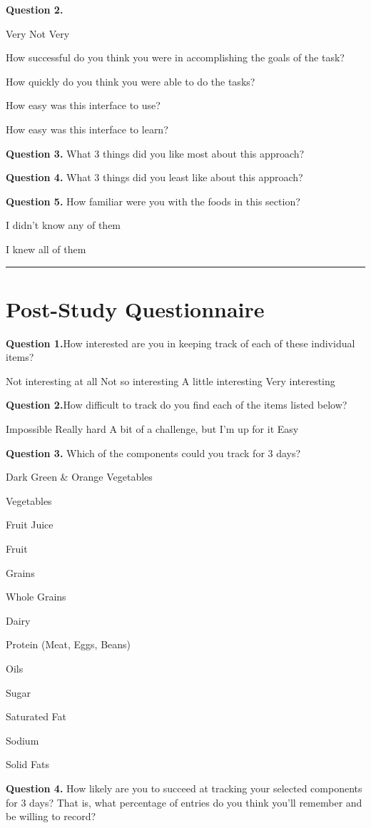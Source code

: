 \noindent\textbf{Question 2.}


 	Very						Not Very
\begin{itemize*}
\item How successful do you think you were in accomplishing the goals of the task?
\item How quickly do you think you were able to do the tasks?
\item How easy was this interface to use?
\item How easy was this interface to learn?
\end{itemize*}
\noindent\textbf{Question 3.}
What 3 things did you like most about this approach? 
 

\noindent\textbf{Question 4.}
What 3 things did you least like about this approach? 
 

\noindent\textbf{Question 5.}
How familiar were you with the foods in this section? 

\begin{itemize*}
\item	I didn't know any of them
\item	
\item	
\item	I knew all of them
\end{itemize*}

\hrule
\section{Post-Study Questionnaire}
\noindent\textbf{Question 1.}How interested are you in keeping track of each of these individual items? 

	Not interesting at all	Not so interesting	A little interesting	Very interesting

\noindent\textbf{Question 2.}How difficult to track do you find each of the items listed below? 

Impossible	Really hard	A bit of a challenge, but I'm up for it	Easy

\noindent\textbf{Question 3.}
Which of the components could you track for 3 days? 

\begin{itemize*}
\item	Dark Green \& Orange Vegetables
\item	Vegetables
\item	Fruit Juice
\item	Fruit
\item	Grains
\item	Whole Grains
\item	Dairy
\item	Protein (Meat, Eggs, Beans)
\item	Oils
\item	Sugar
\item	Saturated Fat
\item	Sodium
\item	Solid Fats
\end{itemize*}
\noindent\textbf{Question 4.}
How likely are you to succeed at tracking your selected components for 3 days? That is, what percentage of entries do you think you'll remember and be willing to record? 

